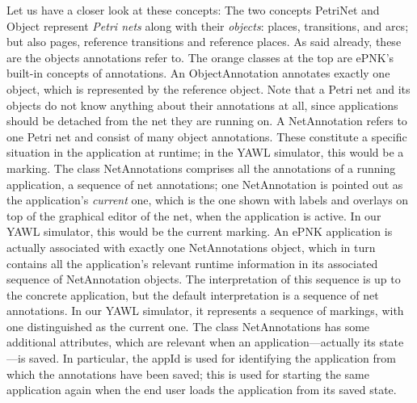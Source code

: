 \documentclass[a4paper]{llncs}
\begin{document}
Let us have a closer look at these concepts: The two concepts {\sf PetriNet}
and {\sf Object} represent \emph{Petri nets} along with their \emph{objects}: places,
transitions, and arcs; but also pages, reference transitions and reference
places. As said already, these are the objects annotations refer to.
The orange classes at the top are ePNK's built-in concepts of annotations.
An {\sf ObjectAnnotation} annotates exactly one object, which is
represented by the reference {\sf object}. Note that
a Petri net and its objects do not know anything about their annotations
at all, since applications should be detached from the net they are running
on. A {\sf NetAnnotation} refers to one
Petri net and consist of many object annotations. These constitute a specific
situation in the application at runtime; in the YAWL simulator, this would be
a marking. The class {\sf NetAnnotations}
comprises all the annotations of a running application, a sequence of net
annotations; one {\sf NetAnnotation} is pointed out as the application's
\emph{current} one, which is the one shown with labels and overlays on top
of the graphical editor of the net, when the application is active. In
our YAWL simulator, this would be the current marking.
An ePNK application is actually associated with exactly one {\sf NetAnnotations}
object, which in turn contains all the application's relevant runtime information
in its associated sequence of {\sf NetAnnotation} objects.
The interpretation of this sequence is up to the concrete application, but the
default interpretation is a sequence of net annotations. In our YAWL simulator,
it represents a sequence of markings, with one distinguished as the {\sf current}
one.
The class {\sf NetAnnotations} has some additional attributes,
which are relevant when an application---actually its state---is saved.
In particular, the {\sf appId} is used for identifying the application from
which the annotations have been saved; this is used for 
starting the same application again when the end user loads the application
from its saved state.
\end{document}
